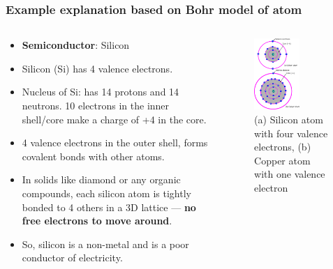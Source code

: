 \begin{frame}
	\frametitle{Example explanation based on Bohr model of atom}
	\begin{columns}
		\begin{column}{0.6\textwidth}
            \begin{itemize}
                \item \textbf{Semiconductor}: Silicon
                \item Silicon (Si) has 4 valence electrons.
                \item Nucleus of Si: has 14 protons and 14 neutrons. 10 electrons in the inner shell/core make a charge of +4 in the core.
                \item 4 valence electrons in the outer shell, forms covalent bonds with other atoms.
                \item In solids like diamond or any organic compounds, each silicon atom is tightly bonded to 4 others in a 3D lattice — \textbf{no free electrons to move around}.
                \item So, silicon is a non-metal and is a poor conductor of electricity.
            \end{itemize}
		\end{column}
        \hfill
		\begin{column}{0.4\textwidth}
            \begin{figure}
                \centering
                \includegraphics[width=0.6\textwidth]{fig/lec02/Cu_Si_atom.pdf}
                \caption{(a) Silicon atom with four valence electrons, (b) Copper atom with one valence electron}
            \end{figure}
		\end{column}
		\end{columns}
\end{frame}

